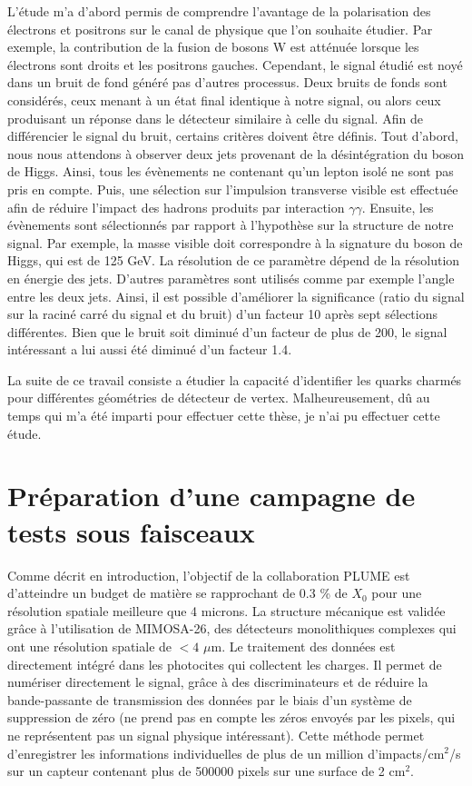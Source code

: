 \documentclass[a4papper, 10pt]{article}
\begin{document}
  L'étude m'a d'abord permis de comprendre l'avantage de la polarisation des électrons et positrons sur le canal de physique que l'on souhaite étudier.
  Par exemple, la contribution de la fusion de bosons W est atténuée lorsque les électrons sont droits et les positrons gauches.
  Cependant, le signal étudié est noyé dans un bruit de fond généré pas d'autres processus.
  Deux bruits de fonds sont considérés, ceux menant à un état final identique à notre signal, ou alors ceux produisant un réponse dans le détecteur similaire à celle du signal.
  Afin de différencier le signal du bruit, certains critères doivent être définis.
  Tout d'abord, nous nous attendons à observer deux jets provenant de la désintégration du boson de Higgs. 
  Ainsi, tous les évènements ne contenant qu'un lepton isolé ne sont pas pris en compte.
  Puis, une sélection sur l'impulsion transverse visible est effectuée afin de réduire l'impact des hadrons produits par interaction $\gamma\gamma$.
  Ensuite, les évènements sont sélectionnés par rapport à l'hypothèse sur la structure de notre signal.
  Par exemple, la masse visible doit correspondre à la signature du boson de Higgs, qui est de 125 GeV.
  La résolution de ce paramètre dépend de la résolution en énergie des jets. 
  D'autres paramètres sont utilisés comme par exemple l'angle entre les deux jets.
  Ainsi, il est possible d'améliorer la significance (ratio du signal sur la raciné carré du signal et du bruit) d'un facteur 10 après sept sélections différentes.
  Bien que le bruit soit diminué d'un facteur de plus de 200, le signal intéressant a lui aussi été diminué d'un facteur 1.4.

  La suite de ce travail consiste a étudier la capacité d'identifier les quarks charmés pour différentes géométries de détecteur de vertex. 
  Malheureusement, dû au temps qui m'a été imparti pour effectuer cette thèse, je n'ai pu effectuer cette étude.

  \section{Préparation d'une campagne de tests sous faisceaux}

    Comme décrit en introduction, l'objectif de la collaboration PLUME est d'atteindre un budget de matière se rapprochant de 0.3 \% de $X_0$ pour une résolution spatiale meilleure que 4 microns.
  La structure mécanique est validée grâce à l'utilisation de MIMOSA-26, des détecteurs monolithiques complexes qui ont une résolution spatiale de $< 4$ $\mu$m.
  Le traitement des données est directement intégré dans les photocites qui collectent les charges. 
  Il permet de numériser directement le signal, grâce à des discriminateurs et de réduire la bande-passante de transmission des données par le biais d'un système de suppression de zéro (ne prend pas en compte les zéros envoyés par les pixels, qui ne représentent pas un signal physique intéressant).
  Cette méthode permet d'enregistrer les informations individuelles de plus de un million d'impacts/cm$^2$/s sur un capteur contenant plus de 500000 pixels sur une surface de 2 cm$^2$.
  
\end{document}
